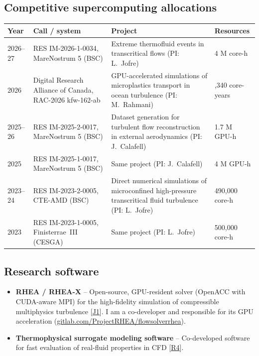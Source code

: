 \documentclass[11pt]{article}
\newcommand{\NEW}[1]{\iffinal #1\else{\color{red}#1}\fi} %
\begin{document}
\subsection{Competitive supercomputing allocations}\label{sec:hpc}
\begin{center}\small
\begin{tabularx}{\textwidth}{@{}p{1.4cm}p{3.3cm}Xp{2.4cm}@{}}
\toprule
\textbf{Year} & \textbf{Call / system} & \textbf{Project} & \textbf{Resources} \\
\midrule
2026--27 & RES IM-2026-1-0034, MareNostrum 5 (BSC) & Extreme thermofluid events in transcritical flows (PI: L.\ Jofre) & 4 M core-h \\
2026 & Digital Research Alliance of Canada, RAC-2026 kfw-162-ab & GPU-accelerated simulations of microplastics transport in ocean turbulence (PI: M.\ Rahmani) & \NEW{1,340} core-years \\
2025--26 & RES IM-2025-2-0017, MareNostrum 5 (BSC) & Dataset generation for turbulent flow reconstruction in external aerodynamics (PI: J.\ Calafell) & 1.7 M GPU-h \\
2025 & RES IM-2025-1-0017, MareNostrum 5 (BSC) & Same project (PI: J.\ Calafell) & 4 M GPU-h \\
2023--24 & RES IM-2023-2-0005, CTE-AMD (BSC) & Direct numerical simulations of microconfined high-pressure transcritical fluid turbulence (PI: L.\ Jofre) & 490,000 core-h \\
2023 & RES IM-2023-1-0005, \NEW{Finisterrae~III} (CESGA) & Same project (PI: L.\ Jofre) & 500,000 core-h \\
\bottomrule
\end{tabularx}
\end{center}

\subsection{Research software}
\begin{itemize}
  \item \textbf{RHEA / RHEA-X} -- Open-source, GPU-resident solver (OpenACC with CUDA-aware MPI) for
  the high-fidelity simulation of compressible multiphysics turbulence
  [\hyperlink{pub-J1}{J1}]. I am a co-developer and responsible for its GPU acceleration (\href{https://gitlab.com/ProjectRHEA/flowsolverrhea}{gitlab.com/ProjectRHEA/flowsolverrhea}).
  
  \item \textbf{Thermophysical surrogate modeling software} -- Co-developed software for fast evaluation of real-fluid properties in CFD [\hyperlink{pub-R4}{R4}].
\end{itemize}
\end{document}
